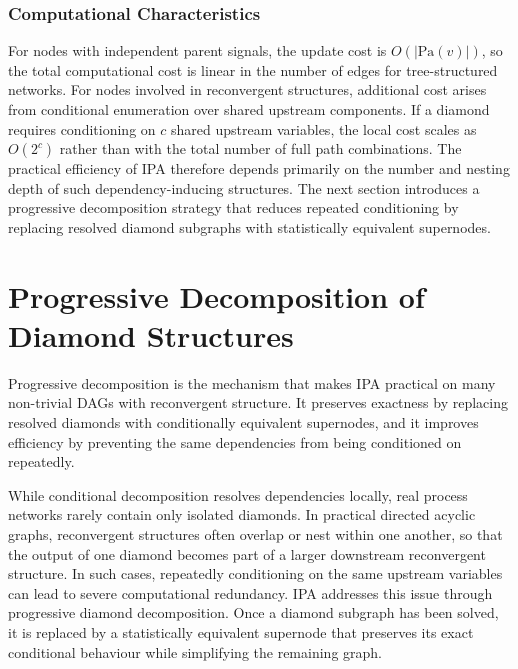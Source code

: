 \documentclass[preprint,12pt]{elsarticle}
\theoremstyle{definition}
\begin{document}
\subsubsection{Computational Characteristics}

For nodes with independent parent signals, the update cost is $O(|\mathrm{Pa}(v)|)$, so the total
computational cost is linear in the number of edges for tree-structured networks. For nodes involved in
reconvergent structures, additional cost arises from conditional enumeration over shared upstream
components. If a diamond requires conditioning on $c$ shared upstream variables, the local cost scales
as $O(2^c)$ rather than with the total number of full path combinations. The practical efficiency of IPA
therefore depends primarily on the number and nesting depth of such dependency-inducing structures. The
next section introduces a progressive decomposition strategy that reduces repeated conditioning by
replacing resolved diamond subgraphs with statistically equivalent supernodes.

\section{Progressive Decomposition of Diamond Structures}\label{sec:decomp}

Progressive decomposition is the mechanism that makes IPA practical on many non-trivial DAGs with
reconvergent structure. It preserves exactness by replacing resolved diamonds with conditionally
equivalent supernodes, and it improves efficiency by preventing the same dependencies from being
conditioned on repeatedly.

While conditional decomposition resolves dependencies locally, real process networks rarely contain only
isolated diamonds. In practical directed acyclic graphs, reconvergent structures often overlap or nest
within one another, so that the output of one diamond becomes part of a larger downstream reconvergent
structure. In such cases, repeatedly conditioning on the same upstream variables can lead to severe
computational redundancy. IPA addresses this issue through progressive diamond decomposition. Once a
diamond subgraph has been solved, it is replaced by a statistically equivalent supernode that preserves
its exact conditional behaviour while simplifying the remaining graph.
\end{document}

